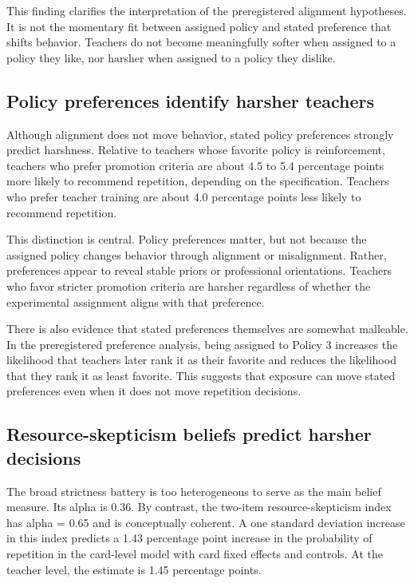 \documentclass[12pt,a4paper]{article}
\begin{document}
This finding clarifies the interpretation of the preregistered alignment hypotheses. It is not the momentary fit between assigned policy and stated preference that shifts behavior. Teachers do not become meaningfully softer when assigned to a policy they like, nor harsher when assigned to a policy they dislike.

\subsection{Policy preferences identify harsher teachers}

Although alignment does not move behavior, stated policy preferences strongly predict harshness. Relative to teachers whose favorite policy is reinforcement, teachers who prefer promotion criteria are about 4.5 to 5.4 percentage points more likely to recommend repetition, depending on the specification. Teachers who prefer teacher training are about 4.0 percentage points less likely to recommend repetition.

This distinction is central. Policy preferences matter, but not because the assigned policy changes behavior through alignment or misalignment. Rather, preferences appear to reveal stable priors or professional orientations. Teachers who favor stricter promotion criteria are harsher regardless of whether the experimental assignment aligns with that preference.

There is also evidence that stated preferences themselves are somewhat malleable. In the preregistered preference analysis, being assigned to Policy 3 increases the likelihood that teachers later rank it as their favorite and reduces the likelihood that they rank it as least favorite. This suggests that exposure can move stated preferences even when it does not move repetition decisions.

\subsection{Resource-skepticism beliefs predict harsher decisions}

The broad strictness battery is too heterogeneous to serve as the main belief measure. Its alpha is 0.36. By contrast, the two-item resource-skepticism index has alpha = 0.65 and is conceptually coherent. A one standard deviation increase in this index predicts a 1.43 percentage point increase in the probability of repetition in the card-level model with card fixed effects and controls. At the teacher level, the estimate is 1.45 percentage points.
\end{document}
